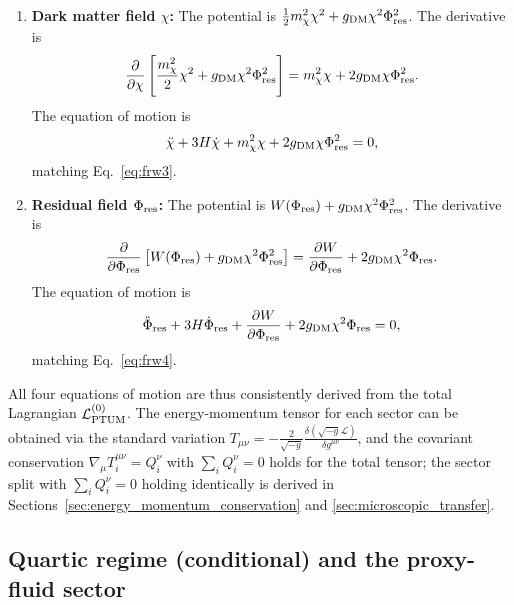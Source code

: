 \documentclass[epj]{svjour}
\begin{document}
\begin{enumerate}
\item \textbf{Dark matter field \(\chi\):} The potential is
      \(\frac{1}{2}m_\chi^2\chi^2 + g_{\rm DM}\chi^2\Phi_{\rm res}^2\).
      The derivative is
      \begin{equation}
      \frac{\partial}{\partial\chi}\left[\frac{m_\chi^2}{2}\chi^2
      + g_{\rm DM}\chi^2\Phi_{\rm res}^2\right]
      = m_\chi^2\chi + 2g_{\rm DM}\chi\Phi_{\rm res}^2.
      \end{equation}
      The equation of motion is
      \begin{equation}
      \ddot\chi + 3H\dot\chi + m_\chi^2\chi
      + 2g_{\rm DM}\chi\Phi_{\rm res}^2 = 0,
      \end{equation}
      matching Eq.~\eqref{eq:frw3}.

\item \textbf{Residual field \(\Phi_{\rm res}\):} The potential is
      \(W(\Phi_{\rm res}) + g_{\rm DM}\chi^2\Phi_{\rm res}^2\).
      The derivative is
      \begin{equation}
      \frac{\partial}{\partial\Phi_{\rm res}}\left[W(\Phi_{\rm res})
      + g_{\rm DM}\chi^2\Phi_{\rm res}^2\right]
      = \frac{\partial W}{\partial\Phi_{\rm res}}
      + 2g_{\rm DM}\chi^2\Phi_{\rm res}.
      \end{equation}
      The equation of motion is
      \begin{equation}
      \ddot\Phi_{\rm res} + 3H\dot\Phi_{\rm res}
      + \frac{\partial W}{\partial\Phi_{\rm res}}
      + 2g_{\rm DM}\chi^2\Phi_{\rm res} = 0,
      \end{equation}
      matching Eq.~\eqref{eq:frw4}.
\end{enumerate}

All four equations of motion are thus consistently derived from the
total Lagrangian \(\mathcal{L}_{\rm PTUM}^{(0)}\). The energy-momentum
tensor for each sector can be obtained via the standard variation
\(T_{\mu\nu} = -\frac{2}{\sqrt{-g}}\frac{\delta(\sqrt{-g}\mathcal{L})}
{\delta g^{\mu\nu}}\), and the covariant conservation
\(\nabla_\mu T^{\mu\nu}_i = Q_i^\nu\) with \(\sum_i Q_i^\nu = 0\)
holds for the total tensor; the sector split with \(\sum_i Q_i^\nu = 0\)
holding identically is derived in
Sections~\ref{sec:energy_momentum_conservation} and
\ref{sec:microscopic_transfer}.

\subsection{Quartic regime (conditional) and the proxy-fluid sector}
\end{document}
